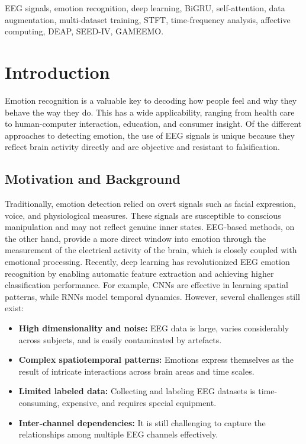 \documentclass[conference]{IEEEtran}
\begin{document}
\begin{IEEEkeywords}
EEG signals, emotion recognition, deep learning, BiGRU, self-attention, data augmentation, multi-dataset training, STFT, time-frequency analysis, affective computing, DEAP, SEED-IV, GAMEEMO.
\end{IEEEkeywords}

\section{Introduction}
\label{sec:introduction}


Emotion recognition is a valuable key to decoding how people feel and why they behave the way they do. This has a wide applicability, ranging from health care to human-computer interaction, education, and consumer insight. Of the different approaches to detecting emotion, the use of EEG signals is unique because they reflect brain activity directly and are objective and resistant to falsification.

\subsection{Motivation and Background}

Traditionally, emotion detection relied on overt signals such as facial expression, voice, and physiological measures. These signals are susceptible to conscious manipulation and may not reflect genuine inner states. EEG-based methods, on the other hand, provide a more direct window into emotion through the measurement of the electrical activity of the brain, which is closely coupled with emotional processing. Recently, deep learning has revolutionized EEG emotion recognition by enabling automatic feature extraction and achieving higher classification performance. For example, CNNs are effective in learning spatial patterns, while RNNs model temporal dynamics. However, several challenges still exist:

\begin{itemize}
    \item \textbf{High dimensionality and noise:} EEG data is large, varies considerably across subjects, and is easily contaminated by artefacts.
    \item \textbf{Complex spatiotemporal patterns:} Emotions express themselves as the result of intricate interactions across brain areas and time scales.
    \item \textbf{Limited labeled data:} Collecting and labeling EEG datasets is time-consuming, expensive, and requires special equipment. 
    \item \textbf{Inter-channel dependencies:} It is still challenging to capture the relationships among multiple EEG channels effectively.
\end{itemize}
\end{document}
